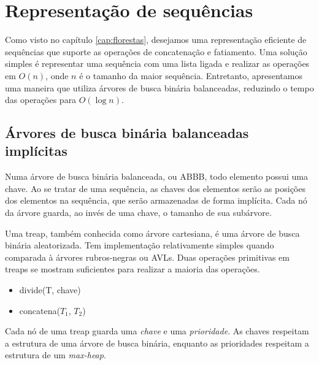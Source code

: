 \chapter{Representação de sequências}
\label{cap:sequencias}

Como visto no capítulo \ref{cap:florestas}, desejamos uma representação eficiente de sequências que suporte as operações de concatenação e fatiamento. Uma solução simples é representar uma sequência com uma lista ligada e realizar as operações em $O(n)$, onde $n$ é o tamanho da maior sequência. Entretanto, apresentamos uma maneira que utiliza árvores de busca binária balanceadas, reduzindo o tempo das operações para $O(\log n)$.

\section{Árvores de busca binária balanceadas implícitas}

Numa árvore de busca binária balanceada, ou ABBB, todo elemento possui uma chave. Ao se tratar de uma sequência, as chaves dos elementos serão as posições dos elementos na sequência, que serão armazenadas de forma implícita. Cada nó da árvore guarda, ao invés de uma chave, o tamanho de sua subárvore. 

Uma treap, também conhecida como árvore cartesiana, é uma árvore de busca binária aleatorizada. Tem implementação relativamente simples quando comparada à árvores rubros-negras ou AVLs. Duas operações primitivas em treaps se mostram suficientes para realizar a maioria das operações.
\begin{itemize}
    \item divide(T, chave)
    \item concatena($T_1$, $T_2$)
\end{itemize}

Cada nó de uma treap guarda uma \textit{chave} e uma \textit{prioridade}. As chaves respeitam a estrutura de uma árvore de busca binária, enquanto as prioridades respeitam a estrutura de um \textit{max-heap}.